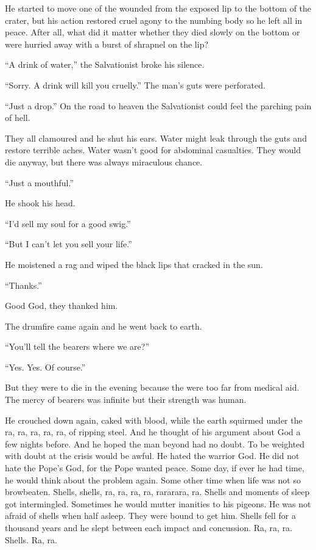 He started to move one of the wounded from the exposed lip to the bottom of the crater, but his action restored cruel agony to the numbing body so he left all in peace. After all, what did it matter whether they died slowly on the bottom or were hurried away with a burst of shrapnel on the lip?

``A drink of water,'' the Salvationist broke his silence.

``Sorry. A drink will kill you cruelly.'' The man's guts were perforated.

``Just a drop.'' On the road to heaven the Salvationist could feel the parching pain of hell.

They all clamoured and he shut his ears. Water might leak through the guts and restore terrible aches. Water wasn't good for abdominal casualties. They would die anyway, but there was always miraculous chance.

``Just a mouthful.''

He shook his head.

``I'd sell my soul for a good swig.''

``But I can't let you sell your life.''

He moistened a rag and wiped the black lips that cracked in the sun.

``Thanks.''

Good God, they thanked him.

The drumfire came again and he went back to earth.

``You'll tell the bearers where we are?''

``Yes. Yes. Of course.''

But they were to die in the evening because the were too far from medical aid. The mercy of bearers was infinite but their strength was human.

He crouched down again, caked with blood, while the earth squirmed under the ra, ra, ra, ra, ra, of ripping steel. And he thought of his argument about God a few nights before. And he hoped the man beyond had no doubt. To be weighted with doubt at the crisis would be awful. He hated the warrior God. He did not hate the Pope's God, for the Pope wanted peace. Some day, if ever he had time, he would think about the problem again. Some other time when life was not so browbeaten. Shells, shells, ra, ra, ra, ra, rararara, ra. Shells and moments of sleep got intermingled. Sometimes he would mutter inanities to his pigeons. He was not afraid of shells when half asleep. They were bound to get him. Shells fell for a thousand years and he slept between each impact and concussion. Ra, ra, ra. Shells. Ra, ra.
